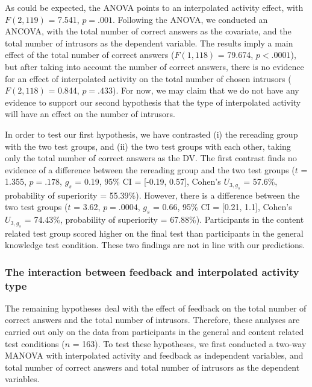 \documentclass[11pt,]{article}
\begin{document}
As could be expected, the ANOVA points to an interpolated activity
effect, with \(F(2, 119)\) = 7.541, \(p = .001\). Following the ANOVA,
we conducted an ANCOVA, with the total number of correct answers as the
covariate, and the total number of intrusors as the dependent variable.
The results imply a main effect of the total number of correct answers
(\(F(1, 118)\) = 79.674, \(p < .0001\)), but after taking into account
the number of correct answers, there is no evidence for an effect of
interpolated activity on the total number of chosen intrusors
(\(F (2, 118)\) = 0.844, \(p = .433\)). For now, we may claim that we do
not have any evidence to support our second hypothesis that the type of
interpolated activity will have an effect on the number of intrusors.

In order to test our first hypothesis, we have contrasted (i) the
rereading group with the two test groups, and (ii) the two test groups
with each other, taking only the total number of correct answers as the
DV. The first contrast finds no evidence of a difference between the
rereading group and the two test groups (\(t\) = 1.355, \(p = .178\),
\(g_s\) = 0.19, 95\% CI = {[}-0.19, 0.57{]}, Cohen's \(U_{3, g_s}\) =
57.6\%, probability of superiority = 55.39\%). However, there is a
difference between the two test groups (\(t\) = 3.62, \(p = .0004\),
\(g_s\) = 0.66, 95\% CI = {[}0.21, 1.1{]}, Cohen's \(U_{3, g_s}\) =
74.43\%, probability of superiority = 67.88\%). Participants in the
content related test group scored higher on the final test than
participants in the general knowledge test condition. These two findings
are not in line with our predictions.

\hypertarget{the-interaction-between-feedback-and-interpolated-activity-type}{%
\subsubsection{The interaction between feedback and interpolated
activity
type}\label{the-interaction-between-feedback-and-interpolated-activity-type}}

The remaining hypotheses deal with the effect of feedback on the total
number of correct answers and the total number of intrusors. Therefore,
these analyses are carried out only on the data from participants in the
general and content related test conditions (\(n\) = 163). To test these
hypotheses, we first conducted a two-way MANOVA with interpolated
activity and feedback as independent variables, and total number of
correct answers and total number of intrusors as the dependent
variables.
\end{document}
